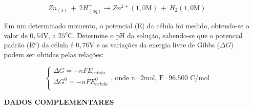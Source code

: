 \documentclass[12pt,a4paper]{article}
\begin{document}
$$ Zn_{(s)} \ + \ 2H^+_{(aq)} \rightarrow Zn^{2+}(1,0\textrm{M}) \ + \ H_2(1,0\textrm{M}) $$


Em um determinado momento, o potencial (E) da célula foi medido, obtendo-se o valor de $0,54$V, a $25^o$C. Determine o pH da solução, sabendo-se que o potencial 
padrão (E$^o$) da célula é $0,76$V e as variações da energia livre de Gibbs ($\Delta G$) podem ser obtidas pelas relações:

$$ 
\begin{cases}
\Delta G = -nFE_{celula} \\
\Delta G^0= -nFE^0_{celula} \\
\end{cases}\textrm{, onde n=2mol, F=96.500 C/mol}$$


\newpage
\begin{center}
\textbf{DADOS COMPLEMENTARES}
\end{center}
 
\end{document}
